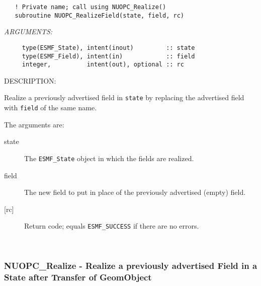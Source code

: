\begin{verbatim}   ! Private name; call using NUOPC_Realize()
   subroutine NUOPC_RealizeField(state, field, rc)\end{verbatim}{\em ARGUMENTS:}
\begin{verbatim}     type(ESMF_State), intent(inout)         :: state
     type(ESMF_Field), intent(in)            :: field
     integer,          intent(out), optional :: rc\end{verbatim}
{\sf DESCRIPTION:\\ }


     \label{NUOPC_RealizeField}
  
     Realize a previously advertised field in {\tt state} by replacing the
     advertised field with {\tt field} of the same name.
  
     The arguments are:
     \begin{description}
     \item[state]
       The {\tt ESMF\_State} object in which the fields are realized.
     \item[field]
       The new field to put in place of the previously advertised (empty) field.
     \item[{[rc]}]
       Return code; equals {\tt ESMF\_SUCCESS} if there are no errors.
     \end{description}
   
 
\mbox{}\hrulefill\ 
 
\subsubsection [NUOPC\_Realize] {NUOPC\_Realize - Realize a previously advertised Field in a State after Transfer of GeomObject}


